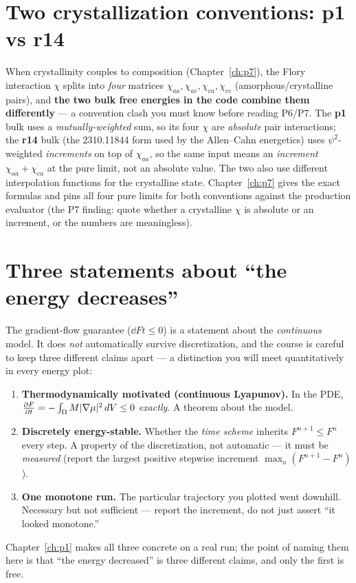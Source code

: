 \section{Two crystallization conventions: p1 vs r14}

When crystallinity couples to composition (Chapter~\ref{ch:p7}), the Flory
interaction $\chi$ splits into \emph{four} matrices
$\chi_{aa},\chi_{ac},\chi_{ca},\chi_{cc}$ (amorphous/crystalline pairs), and
\textbf{the two bulk free energies in the code combine them differently} ---
a convention clash you must know before reading P6/P7. The \textbf{p1} bulk
uses a \emph{mutually-weighted} sum, so its four $\chi$ are \emph{absolute}
pair interactions; the \textbf{r14} bulk (the 2310.11844 form used by the
Allen--Cahn energetics) uses $\psi^2$-weighted \emph{increments} on top of
$\chi_{aa}$, so the same input means an \emph{increment} $\chi_{aa}+\chi_{ca}$
at the pure limit, not an absolute value. The two also use different
interpolation functions for the crystalline state. Chapter~\ref{ch:p7} gives
the exact formulas and  pins all four pure limits
for both conventions against the production evaluator (the P7 finding: quote
whether a crystalline $\chi$ is absolute or an increment, or the numbers are
meaningless).

\section{Three statements about ``the energy decreases''}

The gradient-flow guarantee ($\dd{F}{t}\le0$) is a statement about the
\emph{continuous} model. It does \emph{not} automatically survive
discretization, and the course is careful to keep three different claims
apart --- a distinction you will meet quantitatively in every energy plot:
\begin{enumerate}[nosep]
  \item \textbf{Thermodynamically motivated (continuous Lyapunov).} In the
        PDE, $\frac{\partial F}{\partial t}=-\int_\Omega M|\nabla\mu|^2\,dV\le0$ \emph{exactly}. A
        theorem about the model.
  \item \textbf{Discretely energy-stable.} Whether the \emph{time scheme}
        inherits $F^{n+1}\le F^{n}$ every step. A property of the
        discretization, not automatic --- it must be \emph{measured} (report
        the largest positive stepwise increment $\max_n(F^{n+1}-F^n)$).
  \item \textbf{One monotone run.} The particular trajectory you plotted
        went downhill. Necessary but not sufficient --- report the
        increment, do not just assert ``it looked monotone.''
\end{enumerate}
Chapter~\ref{ch:p1} makes all three concrete on a real run; the point of
naming them here is that ``the energy decreased'' is three different claims,
and only the first is free.

